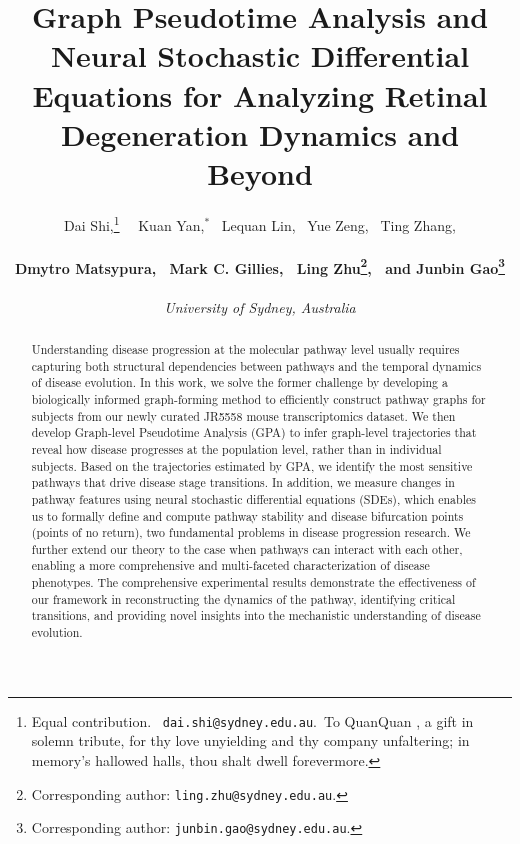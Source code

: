 \documentclass{article} %
\title{Graph Pseudotime Analysis and Neural Stochastic Differential Equations for Analyzing Retinal Degeneration Dynamics and Beyond}
\author{%
  Dai Shi,\thanks{Equal contribution.  \faEnvelope \ \texttt{dai.shi@sydney.edu.au}.\ To QuanQuan \faCat, a gift in solemn tribute, for thy love unyielding and thy company unfaltering; in memory’s hallowed halls, thou shalt dwell forevermore.}  \
  \ Kuan Yan,$^*$  
  \ Lequan Lin,  
  \ Yue Zeng,  
  \ Ting Zhang,  \\~\\
  \textbf{Dmytro Matsypura,  
  \ Mark C. Gillies,  
  \ Ling Zhu\thanks{Corresponding author: \texttt{ling.zhu@sydney.edu.au}.},  
  \ and Junbin Gao\thanks{Corresponding author: \texttt{junbin.gao@sydney.edu.au}.}} \\~\\
  \textit{University of Sydney, Australia}
}
\date{}
\begin{document}
\maketitle


\begin{abstract}
Understanding disease progression at the molecular pathway level usually requires capturing both structural dependencies between pathways and the temporal dynamics of disease evolution. In this work, we solve the former challenge by developing a biologically informed graph-forming method to efficiently construct pathway graphs for subjects from our newly curated JR5558 mouse transcriptomics dataset. We then develop Graph-level Pseudotime Analysis (GPA) to infer graph-level trajectories that reveal how disease progresses at the population level, rather than in individual subjects. Based on the trajectories estimated by GPA, we identify the most sensitive pathways that drive disease stage transitions. In addition, we measure changes in pathway features using neural stochastic differential equations (SDEs), which enables us to formally define and compute pathway stability and disease bifurcation points (points of no return), two fundamental problems in disease progression research. We further extend our theory to the case when pathways can interact with each other, enabling a more comprehensive and multi-faceted characterization of disease phenotypes. The comprehensive experimental results demonstrate the effectiveness of our framework in reconstructing the dynamics of the pathway, identifying critical transitions, and providing novel insights into the mechanistic understanding of disease evolution.




















    
\end{abstract}
\end{document}

